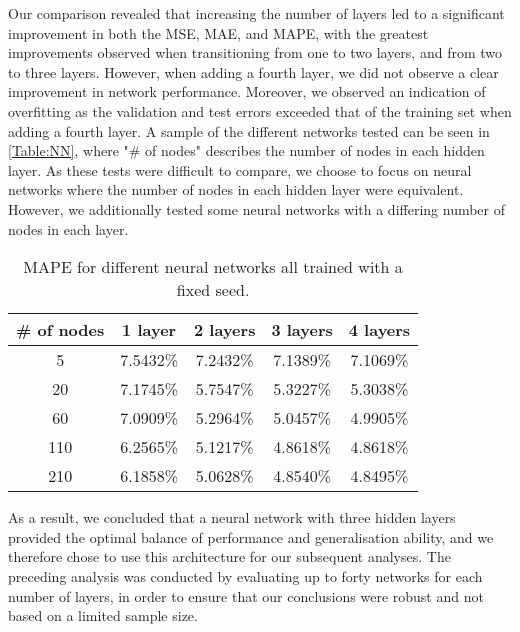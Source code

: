 Our comparison revealed that increasing the number of layers led to a significant improvement in both the MSE, MAE, and MAPE, with the greatest improvements observed when transitioning from one to two layers, and from two to three layers. However, when adding a fourth layer, we did not observe a clear improvement in network performance. Moreover, we observed an indication of overfitting as the validation and test errors exceeded that of the training set when adding a fourth layer. A sample of the different networks tested can be seen in \autoref{Table:NN}, where "\# of nodes" describes the number of nodes in each hidden layer. As these tests were difficult to compare, we choose to focus on neural networks where the number of nodes in each hidden layer were equivalent. However, we additionally tested some neural networks with a differing number of nodes in each layer.

\begin{table}[H]
    \centering
    {\renewcommand{\arraystretch}{1.25}\begin{tabular}{c|cccc}
        \# of nodes &  1 layer & 2 layers & 3 layers & 4 layers\\\hline
        5   & 7.5432\% & 7.2432\% & 7.1389\% & 7.1069\% \\ \hline
        20  & 7.1745\% & 5.7547\% & 5.3227\% & 5.3038\% \\ \hline
        60  & 7.0909\% & 5.2964\% & 5.0457\% & 4.9905\% \\ \hline
        110 & 6.2565\% & 5.1217\% & 4.8618\% & 4.8618\% \\ \hline
        210 & 6.1858\% & 5.0628\% & 4.8540\% & 4.8495\%
    \end{tabular}}
    \caption{MAPE for different neural networks all trained with a fixed seed.}
    \label{Table:NN}
\end{table}

As a result, we concluded that a neural network with three hidden layers provided the optimal balance of performance and generalisation ability, and we therefore chose to use this architecture for our subsequent analyses. The preceding analysis was conducted by evaluating up to forty networks for each number of layers, in order to ensure that our conclusions were robust and not based on a limited sample size. 

